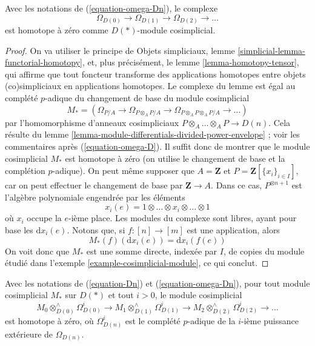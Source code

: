 \begin{lemma}
\label{lemma-vanishing-omega-1}
Avec les notations de (\ref{equation-omega-Dn}), le complexe
$$
\Omega_{D(0)} \to \Omega_{D(1)} \to \Omega_{D(2)} \to \ldots
$$
est homotope à zéro comme $D(*)$-module cosimplicial.
\end{lemma}

\begin{proof}
On va utiliser le principe de
Objets simpliciaux, lemme \ref{simplicial-lemma-functorial-homotopy},
et, plus précisément, le
lemme \ref{lemma-homotopy-tensor},
qui affirme que tout foncteur transforme des applications homotopes entre objets
(co)simpliciaux en applications homotopes.
Le complexe du lemme est égal au complété $p$-adique du
changement de base du module cosimplicial
$$
M_* = \left(
\Omega_{P/A} \to
\Omega_{P \otimes_A P/A} \to
\Omega_{P \otimes_A P \otimes_A P/A} \to \ldots
\right)
$$
par l'homomorphisme d'anneaux cosimpliciaux $P\otimes_A \ldots \otimes_A P \to D(n)$. Cela
résulte du lemme \ref{lemma-module-differentials-divided-power-envelope} ;
voir les commentaires après (\ref{equation-omega-D}). Il
suffit donc de montrer que le module cosimplicial $M_*$ est homotope à zéro
(on utilise le changement de base et la complétion $p$-adique).
On peut même supposer que $A = \mathbf{Z}$ et $P = \mathbf{Z}[\{x_i\}_{i \in I}]$,
car on peut effectuer le changement de base par $\mathbf{Z} \to A$.
Dans ce cas, $P^{\otimes n + 1}$ est l'algèbre polynomiale engendrée par les éléments
$$
x_i(e) = 1 \otimes \ldots \otimes x_i \otimes \ldots \otimes 1
$$
où $x_i$ occupe la $e$-ième place. Les modules du complexe sont libres, ayant
pour base les $\text{d}x_i(e)$. Notons que, si $f : [n] \to [m]$ est une
application, alors
$$
M_*(f)(\text{d}x_i(e)) = \text{d}x_i(f(e))
$$
On voit donc que $M_*$ est une somme directe, indexée par $I$, de copies du module
étudié dans l'exemple \ref{example-cosimplicial-module}, ce qui conclut.
\end{proof}

\begin{lemma}
\label{lemma-vanishing}
Avec les notations de (\ref{equation-Dn}) et (\ref{equation-omega-Dn}),
pour tout module cosimplicial $M_*$ sur $D(*)$ et tout
$i > 0$, le module cosimplicial
$$
M_0 \otimes^\wedge_{D(0)} \Omega^i_{D(0)} \to
M_1 \otimes^\wedge_{D(1)} \Omega^i_{D(1)} \to
M_2 \otimes^\wedge_{D(2)} \Omega^i_{D(2)} \to \ldots
$$
est homotope à zéro, où $\Omega^i_{D(n)}$ est le complété $p$-adique
de la $i$-ième puissance extérieure de $\Omega_{D(n)}$.
\end{lemma}

